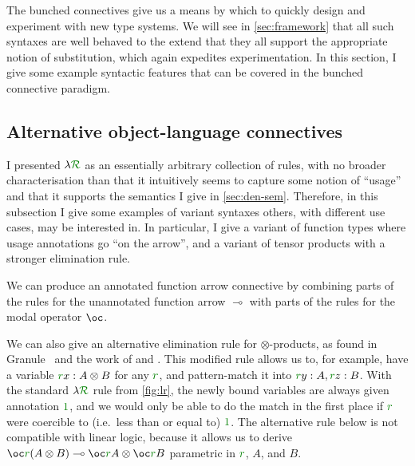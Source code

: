 The bunched connectives give us a means by which to quickly design and
experiment with new type systems.
We will see in \cref{sec:framework} that all such syntaxes are well behaved to
the extend that they all support the appropriate notion of substitution, which
again expedites experimentation.
In this section, I give some example syntactic features that can be covered in
the bunched connective paradigm.

\subsection{Alternative object-language connectives}\label{sec:alt}

I presented $\name$ as an essentially arbitrary collection of rules, with no
broader characterisation than that it intuitively seems to capture some notion
of ``usage'' and that it supports the semantics I give in \cref{sec:den-sem}.
Therefore, in this subsection I give some examples of variant syntaxes others,
with different use cases, may be interested in.
In particular, I give a variant of function types where usage annotations go
``on the arrow'', and a variant of tensor products with a stronger elimination
rule.

We can produce an annotated function arrow connective by combining parts of the
rules for the unannotated function arrow $\multimap$ with parts of the rules for
the modal operator $\oc$.


We can also give an alternative elimination rule for $\otimes$-products, as
found in Granule~\citep{Granule18,HMWO21} and the work of
\citet{AbelBernardy2020} and \citet{reed10distance}.
This modified rule allows us to, for example, have a variable
$\gr rx : A \otimes B$ for any $\gr r$, and pattern-match it into
$\gr ry : A, \gr rz : B$.
With the standard $\name$ rule from \cref{fig:lr}, the newly bound variables are
always given annotation $\gr 1$, and we would only be able to do the match in
the first place if $\gr r$ were coercible to (i.e.\ less than or equal to)
$\gr1$.
The alternative rule below is not compatible with linear logic, because it
allows us to derive
$\oc\gr r\plr{A \otimes B} \multimap \oc\gr rA \otimes \oc\gr r B$
parametric in $\gr r$, $A$, and $B$.

